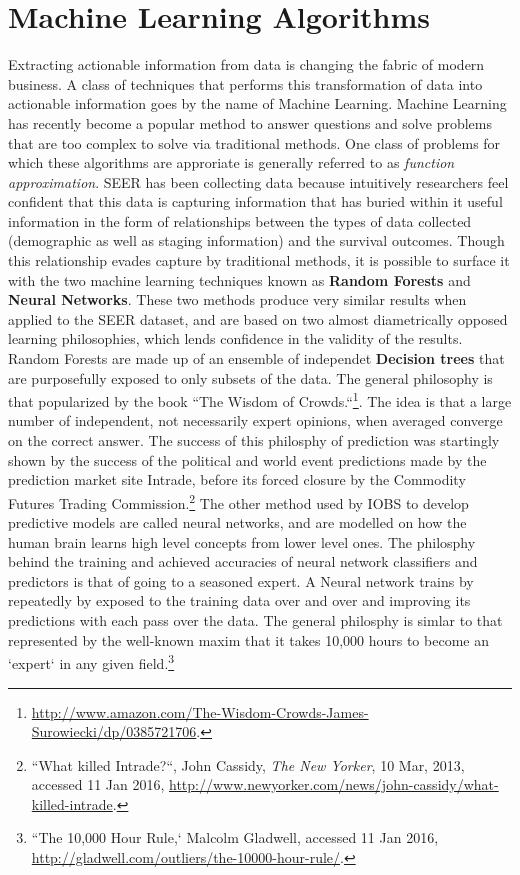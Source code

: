 \documentclass{article}
\begin{document}
\section{Machine Learning Algorithms}


Extracting actionable information from data is changing the fabric of modern business. A class of techniques that performs this transformation of data into actionable information goes by the name of Machine Learning.
Machine Learning has recently become a popular method to answer questions and solve problems that are too complex to solve via traditional methods. 
One class of problems for which these algorithms are approriate is generally referred to as 
\textit{function approximation}. SEER has been collecting data because intuitively researchers feel confident that this data is capturing information that has buried within it useful information in the form of  relationships between the types of data collected (demographic as well as staging information) and the survival outcomes.
Though this relationship evades capture by traditional methods, it is possible to surface it with the two machine learning techniques known as \textbf{Random Forests} and \textbf{Neural Networks}. These two methods produce very similar results when applied to the SEER dataset, and are based on two almost diametrically opposed learning philosophies, which lends confidence in the validity of the results. Random Forests are made up of an ensemble of independet \textbf{Decision trees} that are purposefully exposed to only subsets of the data. The general philosophy is that popularized by the book ``The Wisdom of Crowds.``\footnote{\url{http://www.amazon.com/The-Wisdom-Crowds-James-Surowiecki/dp/0385721706}.}. The idea is that a large number of independent, not necessarily expert opinions, when averaged converge on the correct answer. The success of this philosphy of prediction was startingly shown by the success of the political and world event predictions made by the prediction market site Intrade, before its forced closure by the Commodity Futures Trading Commission.\footnote{``What killed Intrade?``, John Cassidy, \textit{The New Yorker}, 10 Mar, 2013, accessed 11 Jan 2016, \url{http://www.newyorker.com/news/john-cassidy/what-killed-intrade}.}
The other method used by IOBS to develop predictive models are called neural networks, and are modelled on how the human brain learns high level concepts from lower level ones. The philosphy behind the training and achieved accuracies of neural network classifiers and predictors is that of going to a seasoned expert. A Neural network trains by repeatedly by exposed to the training data over and over and improving its predictions with each pass over the data. The general philosphy is simlar to that represented by the well-known maxim that it takes 10,000 hours to become an `expert` in any given field.\footnote{``The 10,000 Hour Rule,` Malcolm Gladwell, accessed 11 Jan 2016, \url{http://gladwell.com/outliers/the-10000-hour-rule/}.}
\end{document}
